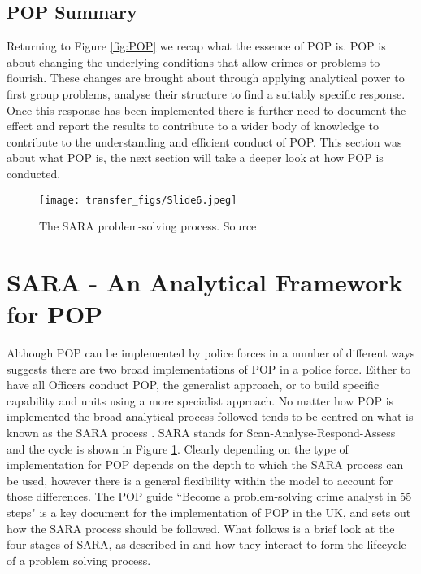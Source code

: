  
\subsection{POP Summary} Returning to Figure \ref{fig:POP} we recap what the essence of POP is. POP is about changing the underlying conditions that allow crimes or problems to flourish. These changes are brought about through applying analytical power to first group problems, analyse their structure to find a suitably specific response. Once this response has been implemented there is further need to document the effect and report the results to contribute to a wider body of knowledge to contribute to the understanding and efficient conduct of POP.  This section was about what POP is, the next section will take a deeper look at how POP is conducted.

\begin{figure}
  \texttt{[image: transfer\_figs/Slide6.jpeg]}
  \caption[The SARA problem-solving process.]{The SARA problem-solving process. Source \textcite{clarke2003becoming}}
  \label{fig:SARA}
\end{figure}

\section{SARA  - An Analytical Framework for POP} Although POP can be implemented by police forces in a number of different ways \textcite{scott2012implementing} suggests there are two broad implementations of POP in a police force. Either to have all Officers conduct POP, the generalist approach, or to build specific capability and units  using a more specialist approach. No matter how POP is implemented the broad analytical process followed tends to be centred on what is known as the SARA process \parencite{POPUCL}. SARA stands for Scan-Analyse-Respond-Assess and the cycle is shown in Figure \ref{fig:SARA}.  Clearly depending on the type of implementation for POP depends on the depth to which the SARA process can be used, however there is a general flexibility within the model to account for those differences. The POP guide ``Become a problem-solving crime analyst in 55 steps"  \parencite{clarke2003becoming} is a key document for the implementation of POP in the UK, and sets out how the SARA process should be followed. What follows is a brief look at the four stages of SARA, as described in  and how they interact to form the lifecycle of a problem solving process.


